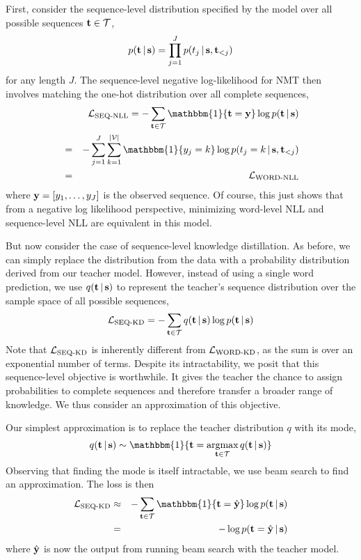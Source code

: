 \documentclass[11pt,letterpaper]{article}
\DeclareMathOperator*{\argmax}{argmax}
\begin{document}
First, consider the sequence-level distribution specified by the model over all
possible sequences $\mathbf{t} \in \mathcal{T}$,
\begin{equation*}
p(\mathbf{t} \,|\, \mathbf{s}) = \prod_{j=1}^J p(t_j \,|\, \mathbf{s}, \mathbf{t}_{<j})
\end{equation*}
for any length $J$.
The sequence-level negative log-likelihood for NMT then involves matching
the one-hot distribution over all complete sequences,
\begin{eqnarray*}
&&\mcL_{\text{SEQ-NLL}} = -\sum_{\tvec \in \mcT} \mathbbm{1}\{\tvec=\yvec\} \log p(\tvec \given \svec) \\ 
&= & -\sum_{j=1}^J \sum_{k=1}^{|\mcV|} \mathbbm{1}\{y_j=k\} \log p(t_{j}=k \given \svec, \tvec_{<j}) 
\\ 
&=& \mcL_{\text{WORD-NLL}}
\end{eqnarray*}
where $\mathbf{y} = [y_1, \dots, y_J]$ is the observed sequence.
Of course, this just shows that from a negative log likelihood perspective,
 minimizing word-level NLL and sequence-level NLL are equivalent in this model.


But now consider the case of sequence-level knowledge distillation.  
As before, we
can simply replace the distribution from the data with a probability
distribution derived from our teacher model.
However, instead of using
a single word prediction, we use $q(\mathbf{t} \,|\, \mathbf{s})$ to represent
the teacher's sequence distribution over the sample space of
all possible sequences,
\begin{equation*}
\mathcal{L}_{\text{SEQ-KD}} = -\sum_{\mathbf{t} \in \mathcal{T}} q(\mathbf{t} \,|\, \mathbf{s}) \log p (\mathbf{t} \,|\, \mathbf{s})
\end{equation*}
Note that $\mathcal{L}_\text{SEQ-KD}$ is inherently different from $\mathcal{L}_\text{WORD-KD}$, as the sum is over an
exponential  number of terms. Despite its intractability, we posit that this sequence-level
objective is worthwhile. It gives the teacher the chance to
assign probabilities to complete sequences and therefore transfer a
broader range of knowledge. We thus consider an approximation of this
objective.

Our simplest approximation is to replace the teacher
distribution $q$ with its mode,
\begin{equation*}
q(\tvec \given \svec) \sim \mathbbm{1}\{\tvec = \argmax_{\tvec \in \mcT} q(\tvec \given \svec )\}
\end{equation*}
Observing that finding the mode is itself intractable, we use beam search 
to find an approximation. The loss is then
\begin{eqnarray*}
\mcL_{\text{SEQ-KD}} &\approx&  - \sum_{\tvec \in \mcT} \mathbbm{1}\{\tvec = \hat{\yvec} \} \log p (\tvec \given \svec) \\
&=& - \log p (\tvec = \hat{\yvec} \given \svec)
\end{eqnarray*}
where $\hat{\mathbf{y}}$ is now the output from running beam search with the teacher model.
\end{document}
